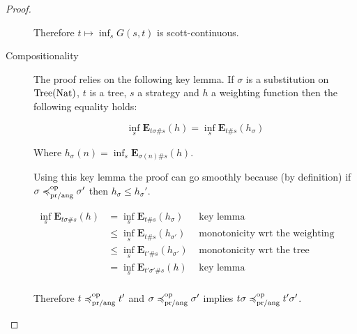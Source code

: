 \begin{proof}
\begin{description}
            Therefore $t \mapsto \inf_s G(s,t)$ is scott-continuous.
        \item[Compositionality]

            The proof relies on the following key lemma. 
            If $\sigma$ is a substitution on $\textnormal{Tree}(\textnormal{Nat})$,
            $t$ is a tree, $s$ a strategy and $h$ a weighting function then
            the following equality holds:


            \begin{equation*}
                \inf_s \mathbf{E}_{t\sigma \# s } (h)
                = 
                \inf_s \mathbf{E}_{t \# s} (h_\sigma)
            \end{equation*}

            Where $h_\sigma (n) = \inf_s \mathbf{E}_{\sigma(n) \# s} (h)$.

            
            Using this key lemma the proof can go smoothly because (by
            definition)
            if $\sigma \preccurlyeq^{\text{op}}_{\text{pr/ang}} \sigma'$ then 
            $h_\sigma \leq h_\sigma'$.

            \begin{align*}
                \inf_s \mathbf{E}_{t\sigma \# s} (h)
                 & = \inf_s \mathbf{E}_{t \# s} (h_\sigma)       & \text{ key lemma }  \\
                 & \leq \inf_s \mathbf{E}_{t \# s} (h_{\sigma'}) & \text{ monotonicity wrt the weighting function } \\
                 & \leq \inf_s \mathbf{E}_{t'\# s} (h_{\sigma'}) & \text{ monotonicity wrt the tree } \\
                 & = \inf_s \mathbf{E}_{t'\sigma' \# s} (h )     & \text{ key lemma } \\
            \end{align*}

            Therefore $ t \preccurlyeq^{\text{op}}_{\text{pr/ang}} t'$ and $\sigma
            \preccurlyeq^{\text{op}}_{\text{pr/ang}} \sigma'$ implies $t\sigma \preccurlyeq^{\text{op}}_{\text{pr/ang}}
            t'\sigma'$.
    \end{description}

\end{proof}

